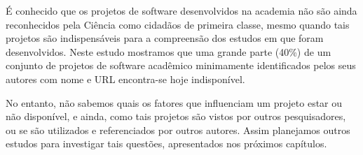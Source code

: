 É conhecido que os projetos de software desenvolvidos na academia não são ainda
reconhecidos pela Ciência como cidadãos de primeira classe, mesmo quando tais
projetos são indispensáveis para a compreensão dos estudos em que foram
desenvolvidos. Neste estudo mostramos que uma grande parte (40\%) de um
conjunto de projetos de software acadêmico minimamente identificados pelos seus
autores com nome e URL encontra-se hoje indisponível.

No entanto, não sabemos quais os fatores que influenciam um projeto estar ou não
disponível, e ainda, como tais projetos são vistos por outros pesquisadores, ou se
são utilizados e referenciados por outros autores. Assim planejamos outros
estudos para investigar tais questões, apresentados nos próximos capítulos.


